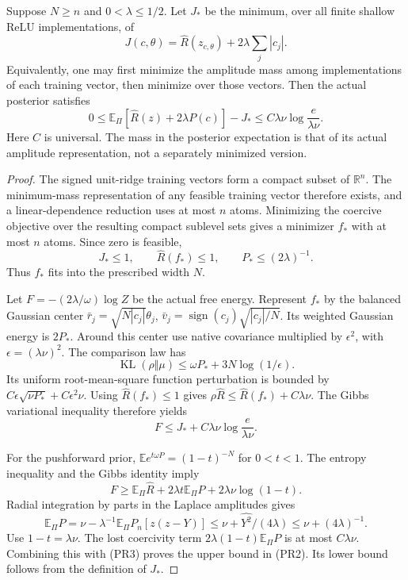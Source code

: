 \begin{proposition}
Suppose $N\ge n$ and $0<\lambda\le1/2$. Let $J_*$ be the minimum,
over all finite shallow ReLU implementations, of
\[
 J(c,\theta)=\widehat R(z_{c,\theta})+2\lambda\sum_j|c_j|.
\]
Equivalently, one may first minimize the amplitude mass among
implementations of each training vector, then minimize over those vectors. Then the actual posterior satisfies
\[
 0\le\mathbb E_\Pi[\widehat R(z)+2\lambda P(c)]-J_*
 \le C\lambda\nu\log\frac{e}{\lambda\nu}. \tag{PR2}
\]
Here $C$ is universal. The mass in the posterior expectation is that
of its actual amplitude representation, not a separately minimized
version.
\end{proposition}
\begin{proof}
The signed unit-ridge training vectors form a compact subset of
$\mathbb R^n$. The minimum-mass representation of any feasible
training vector therefore exists, and a linear-dependence reduction
uses at most $n$ atoms. Minimizing the coercive objective over the
resulting compact sublevel sets gives a minimizer $f_*$ with at most
$n$ atoms. Since zero is feasible,
\[
 J_*\le1,\qquad \widehat R(f_*)\le1,\qquad P_*\le(2\lambda)^{-1}.
\]
Thus $f_*$ fits into the prescribed width $N$.

Let $F=-(2\lambda/\omega)\log Z$ be the actual free energy.
Represent $f_*$ by the balanced Gaussian center
$\bar r_j=\sqrt{N|c_j|}\theta_j$,
$\bar v_j=\operatorname{sign}(c_j)\sqrt{|c_j|/N}$.
Its weighted Gaussian energy is $2P_*$.
Around this center use native covariance multiplied by
$\epsilon^2$, with $\epsilon=(\lambda\nu)^2$.
The comparison law has
\[
 \operatorname{KL}(\rho\Vert\mu)
 \le\omega P_*+3N\log(1/\epsilon).
\]
Its uniform root-mean-square function perturbation is bounded by
$C\epsilon\sqrt{\nu P_*}+C\epsilon^2\nu$.
Using $\widehat R(f_*)\le1$ gives
$\rho\widehat R\le\widehat R(f_*)+C\lambda\nu$.
The Gibbs variational inequality therefore yields
\[
 F\le J_*+C\lambda\nu\log\frac e{\lambda\nu}. \tag{PR3}
\]

For the pushforward prior,
$\mathbb E e^{t\omega P}=(1-t)^{-N}$ for $0<t<1$.
The entropy inequality and the Gibbs identity imply
\[
 F\ge\mathbb E_\Pi\widehat R+2\lambda t\mathbb E_\Pi P
       +2\lambda\nu\log(1-t).
\]
Radial integration by parts in the Laplace amplitudes gives
\[
 \mathbb E_\Pi P
 =\nu-\lambda^{-1}\mathbb E_\Pi P_n[z(z-Y)]
 \le\nu+\widehat{Y^2}/(4\lambda)
 \le\nu+(4\lambda)^{-1}.
\]
Use $1-t=\lambda\nu$. The lost coercivity term
$2\lambda(1-t)\mathbb E_\Pi P$ is at most $C\lambda\nu$.
Combining this with (PR3) proves the upper bound in (PR2).
Its lower bound follows from the definition of $J_*$.
\end{proof}

